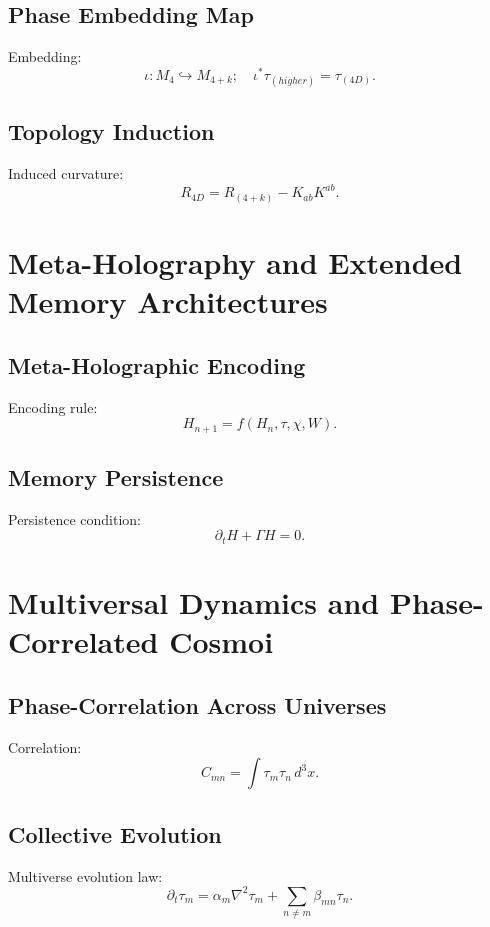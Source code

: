 \section{Phase Embedding Map}
Embedding:
\[
\iota: M_4 \hookrightarrow M_{4+k};\quad \iota^\ast \tau_{(higher)} = \tau_{(4D)}.
\]

\section{Topology Induction}
Induced curvature:
\[
R_{4D} = R_{(4+k)} - K_{ab}K^{ab}.
\]

\chapter{Meta-Holography and Extended Memory Architectures}

\section{Meta-Holographic Encoding}
Encoding rule:
\[
H_{n+1} = f(H_n,\tau,\chi,W).
\]

\section{Memory Persistence}
Persistence condition:
\[
\partial_t H + \Gamma H = 0.
\]

\chapter{Multiversal Dynamics and Phase-Correlated Cosmoi}

\section{Phase-Correlation Across Universes}
Correlation:
\[
C_{mn} = \int \tau_m \tau_n\, d^3x.
\]

\section{Collective Evolution}
Multiverse evolution law:
\[
\partial_t \tau_m = \alpha_m \nabla^2 \tau_m + \sum_{n\neq m}\beta_{mn}\tau_n.
\]

